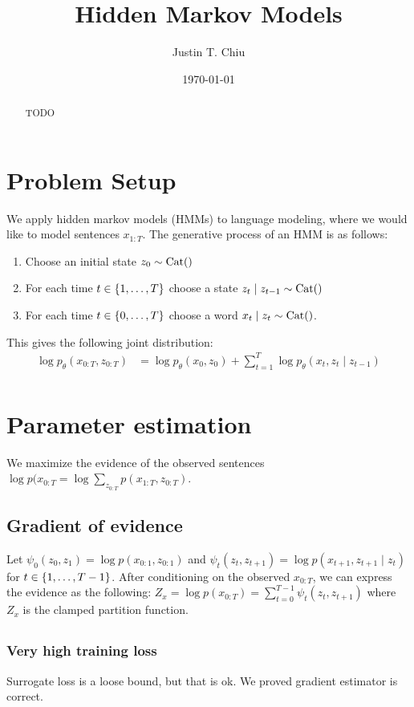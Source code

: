\documentclass[12pt]{article}
\title{Hidden Markov Models}
\author{
Justin T. Chiu
}
\date{\today}
\begin{document}
\maketitle

\begin{abstract}
TODO
\end{abstract}

\section{Problem Setup}
We apply hidden markov models (HMMs) to language modeling,
where we would like to model sentences $x_{1:T}$.
The generative process of an HMM is as follows:
\begin{enumerate}
\item Choose an initial state $z_0 \sim \mathrm{Cat}()$
\item For each time $t \in \left\{1, \ldots, T\right\}$ choose a state
$z_t \mid z_{t-1} \sim \mathrm{Cat}()$
\item For each time $t \in \left\{0, \ldots, T\right\}$ choose a word
$x_t \mid z_t \sim \mathrm{Cat}()$.
\end{enumerate}

This gives the following joint distribution:
\begin{align*}
\log p_\theta(x_{0:T}, z_{0:T})
&= \log p_\theta(x_0, z_0) + \sum_{t=1}^T \log p_\theta(x_t, z_t \mid z_{t-1})\\
\end{align*}

\section{Parameter estimation}
We maximize the evidence of the observed sentences
$\log p(x_{0:T} = \log \sum_{z_{0:T}} p(x_{1:T}, z_{0:T})$.

\subsection{Gradient of evidence}
Let $\psi_0(z_0, z_1) = \log p(x_{0:1}, z_{0:1})$ and
$\psi_t(z_{t}, z_{t+1}) = \log p(x_{t+1}, z_{t+1} \mid z_{t})$ for $t \in \left\{1, \ldots, T-1\right\}$.
After conditioning on the observed $x_{0:T}$, we can express the evidence as the following:
$Z_x = \log p(x_{0:T}) = \sum_{t=0}^{T-1} \psi_t(z_t, z_{t+1})$
where $Z_x$ is the clamped partition function.

\subsection{}


\subsubsection{Very high training loss}
Surrogate loss is a loose bound, but that is ok.
We proved gradient estimator is correct.

%
%
\end{document}
